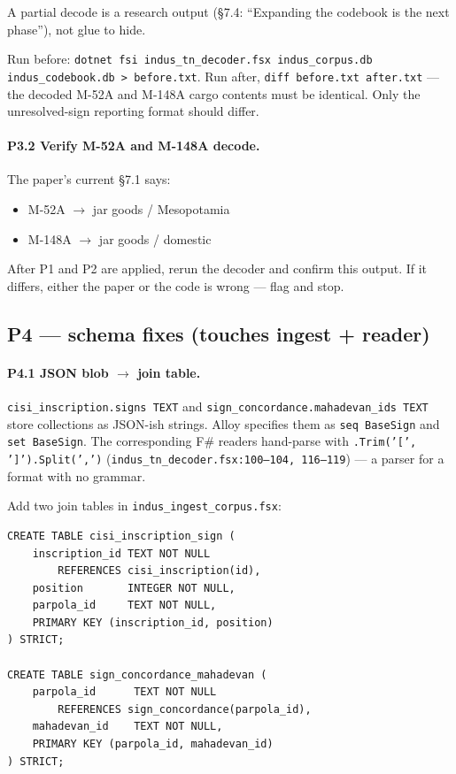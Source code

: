 \documentclass[11pt]{article}
\begin{document}
A partial decode is a research output (§7.4: ``Expanding the
codebook is the next phase''), not glue to hide.

Run before: \texttt{dotnet fsi indus\_tn\_decoder.fsx
indus\_corpus.db indus\_codebook.db > before.txt}.
Run after, \texttt{diff before.txt after.txt} --- the decoded
M-52A and M-148A cargo contents must be identical.  Only the
unresolved-sign reporting format should differ.

\paragraph{P3.2 Verify M-52A and M-148A decode.}
The paper's current \S7.1 says:

\begin{itemize}[leftmargin=2em]
\item M-52A $\to$ jar goods / Mesopotamia
\item M-148A $\to$ jar goods / domestic
\end{itemize}

After P1 and P2 are applied, rerun the decoder and confirm this
output.  If it differs, either the paper or the code is wrong
--- flag and stop.

\subsection{P4 --- schema fixes (touches ingest + reader)}

\paragraph{P4.1 JSON blob $\to$ join table.}
\texttt{cisi\_inscription.signs TEXT} and
\texttt{sign\_concordance.mahadevan\_ids TEXT} store collections
as JSON-ish strings.  Alloy specifies them as \texttt{seq
BaseSign} and \texttt{set BaseSign}.  The corresponding F\#
readers hand-parse with \texttt{.Trim('[', ']').Split(',')}
(\texttt{indus\_tn\_decoder.fsx:100--104, 116--119}) --- a
parser for a format with no grammar.

Add two join tables in \texttt{indus\_ingest\_corpus.fsx}:

\begin{Verbatim}[fontsize=\small,frame=single]
CREATE TABLE cisi_inscription_sign (
    inscription_id TEXT NOT NULL
        REFERENCES cisi_inscription(id),
    position       INTEGER NOT NULL,
    parpola_id     TEXT NOT NULL,
    PRIMARY KEY (inscription_id, position)
) STRICT;

CREATE TABLE sign_concordance_mahadevan (
    parpola_id      TEXT NOT NULL
        REFERENCES sign_concordance(parpola_id),
    mahadevan_id    TEXT NOT NULL,
    PRIMARY KEY (parpola_id, mahadevan_id)
) STRICT;
\end{Verbatim}
\end{document}
